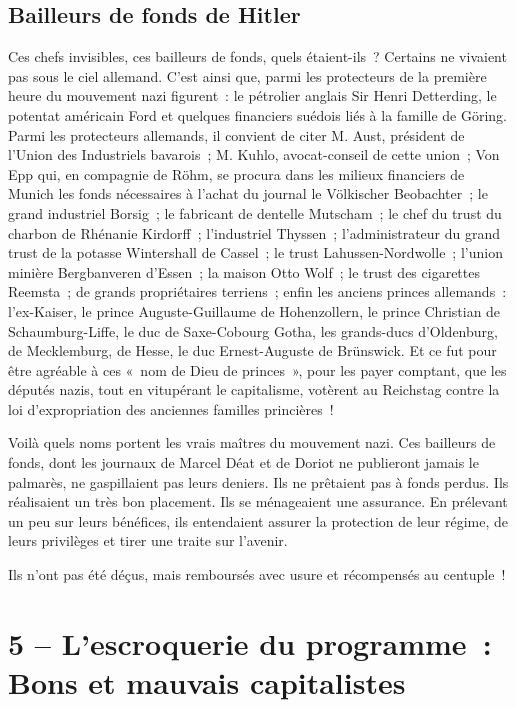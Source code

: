 \documentclass[french,twoside]{book} %
\newcommand\chapteropen{} %
\newcommand\chapterclose{} %
\begin{document}
\section[{Bailleurs de fonds de Hitler}]{Bailleurs de fonds de Hitler}
\noindent Ces chefs invisibles, ces bailleurs de fonds, quels étaient-ils ? Certains ne vivaient pas sous le ciel allemand. C’est ainsi que, parmi les protecteurs de la première heure du mouvement nazi figurent : le pétrolier anglais Sir Henri Detterding, le potentat américain Ford et quelques financiers suédois liés à la famille de Göring. Parmi les protecteurs allemands, il convient de citer M. Aust, président de l’Union des Industriels bavarois ; M. Kuhlo, avocat-conseil de cette union ; Von Epp qui, en compagnie de Röhm, se procura dans les milieux financiers de Munich les fonds nécessaires à l’achat du journal le Völkischer Beobachter ; le grand industriel Borsig ; le fabricant de dentelle Mutscham ; le chef du trust du charbon de Rhénanie Kirdorff ; l’industriel Thyssen ; l’administrateur du grand trust de la potasse Wintershall de Cassel ; le trust Lahussen-Nordwolle ; l’union minière Bergbanveren d’Essen ; la maison Otto Wolf ; le trust des cigarettes Reemsta ; de grands propriétaires terriens ; enfin les anciens princes allemands : l’ex-Kaiser, le prince Auguste-Guillaume de Hohenzollern, le prince Christian de Schaumburg-Liffe, le duc de Saxe-Cobourg Gotha, les grands-ducs d’Oldenburg, de Mecklemburg, de Hesse, le duc Ernest-Auguste de Brünswick. Et ce fut pour être agréable à ces « nom de Dieu de princes », pour les payer comptant, que les députés nazis, tout en vitupérant le capitalisme, votèrent au Reichstag contre la loi d’expropriation des anciennes familles princières !\par
Voilà quels noms portent les vrais maîtres du mouvement nazi. Ces bailleurs de fonds, dont les journaux de Marcel Déat et de Doriot ne publieront jamais le palmarès, ne gaspillaient pas leurs deniers. Ils ne prêtaient pas à fonds perdus. Ils réalisaient un très bon placement. Ils se ménageaient une assurance. En prélevant un peu sur leurs bénéfices, ils entendaient assurer la protection de leur régime, de leurs privilèges et tirer une traite sur l’avenir.\par
Ils n’ont pas été déçus, mais remboursés avec usure et récompensés au centuple !
\chapterclose


\chapteropen
\chapter[{5 – L’escroquerie du programme : Bons et mauvais capitalistes}]{5 – L’escroquerie du programme : Bons et mauvais capitalistes}\renewcommand{\leftmark}{5 – L’escroquerie du programme : Bons et mauvais capitalistes}
\end{document}
